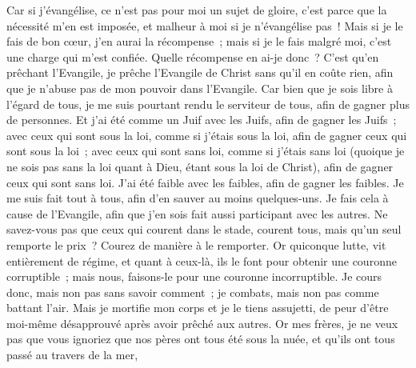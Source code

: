\begin{multicols}{2}
Car si j'évangélise, ce n'est pas pour moi un sujet de gloire, c'est parce que la nécessité m'en est imposée, et malheur à moi si je n'évangélise pas~!
Mais si je le fais de bon cœur, j'en aurai la récompense~; mais si je le fais malgré moi, c'est une charge qui m'est confiée.
Quelle récompense en ai-je donc~? C'est qu'en prêchant l'Evangile, je prêche l'Evangile de Christ sans qu'il en coûte rien, afin que je n'abuse pas de mon pouvoir dans l'Evangile.
Car bien que je sois libre à l'égard de tous, je me suis pourtant rendu le serviteur de tous, afin de gagner plus de personnes.
Et j'ai été comme un Juif avec les Juifs, afin de gagner les Juifs~; avec ceux qui sont sous la loi, comme si j'étais sous la loi, afin de gagner ceux qui sont sous la loi~;
avec ceux qui sont sans loi, comme si j'étais sans loi (quoique je ne sois pas sans la loi quant à Dieu, étant sous la loi de Christ), afin de gagner ceux qui sont sans loi.
J'ai été faible avec les faibles, afin de gagner les faibles. Je me suis fait tout à tous, afin d'en sauver au moins quelques-uns.
Je fais cela à cause de l'Evangile, afin que j'en sois fait aussi participant avec les autres.
Ne savez-vous pas que ceux qui courent dans le stade, courent tous, mais qu'un seul remporte le prix~? Courez de manière à le remporter.
Or quiconque lutte, vit entièrement de régime, et quant à ceux-là, ils le font pour obtenir une couronne corruptible~; mais nous, faisons-le pour une couronne incorruptible.
Je cours donc, mais non pas sans savoir comment~; je combats, mais non pas comme battant l'air.
Mais je mortifie mon corps et je le tiens assujetti, de peur d'être moi-même désapprouvé après avoir prêché aux autres.
\VerseOne{}Or mes frères, je ne veux pas que vous ignoriez que nos pères ont tous été sous la nuée, et qu'ils ont tous passé au travers de la mer,

\end{multicols}
